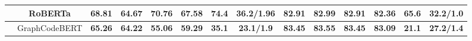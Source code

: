 \begin{table*}[t!]
{\begin{tabular}{ccccccccc ccccc}
    & RoBERTa &\textbf{68.81} &\textbf{64.67}  &\textbf{70.76}  &\textbf{67.58}  &\textbf{74.4} &\textbf{36.2/1.96} &\textbf{82.91} &\textbf{82.99}&\textbf{82.91} &\textbf{82.36} &\textbf{65.6}  & \textbf{32.2/1.0}  \\\cline

    & GraphCodeBERT &\textbf{65.26}  & \textbf{64.22} &\textbf{55.06} &\textbf{59.29} &\textbf{35.1}  &\textbf{23.1/1.9} &\textbf{83.45} &\textbf{83.55} & \textbf{83.45}& \textbf{83.09} &\textbf{21.1}  & \textbf{27.2/1.4} \\\hline
  
  
\end{tabular}}
\end{table*}
